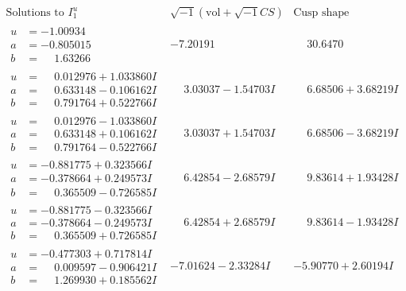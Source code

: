 \documentclass[1p]{elsarticle_modified}
\theoremstyle{definition}
\newcommand{\I}{\sqrt{-1}}
\begin{document}
$$\begin{array}{c|c|c}  
\text{Solutions to }I^u_{1}& \I (\text{vol} + \sqrt{-1}CS) & \text{Cusp shape}\\
 \hline 
\begin{aligned}
u &= -1.00934\phantom{ +0.000000I} \\
a &= -0.805015\phantom{ +0.000000I} \\
b &= \phantom{-}1.63266\phantom{ +0.000000I}\end{aligned}
 & -7.20191\phantom{ +0.000000I} & \phantom{-}30.6470\phantom{ +0.000000I} \\ \hline\begin{aligned}
u &= \phantom{-}0.012976 + 1.033860 I \\
a &= \phantom{-}0.633148 - 0.106162 I \\
b &= \phantom{-}0.791764 + 0.522766 I\end{aligned}
 & \phantom{-}3.03037 - 1.54703 I & \phantom{-}6.68506 + 3.68219 I \\ \hline\begin{aligned}
u &= \phantom{-}0.012976 - 1.033860 I \\
a &= \phantom{-}0.633148 + 0.106162 I \\
b &= \phantom{-}0.791764 - 0.522766 I\end{aligned}
 & \phantom{-}3.03037 + 1.54703 I & \phantom{-}6.68506 - 3.68219 I \\ \hline\begin{aligned}
u &= -0.881775 + 0.323566 I \\
a &= -0.378664 + 0.249573 I \\
b &= \phantom{-}0.365509 - 0.726585 I\end{aligned}
 & \phantom{-}6.42854 - 2.68579 I & \phantom{-}9.83614 + 1.93428 I \\ \hline\begin{aligned}
u &= -0.881775 - 0.323566 I \\
a &= -0.378664 - 0.249573 I \\
b &= \phantom{-}0.365509 + 0.726585 I\end{aligned}
 & \phantom{-}6.42854 + 2.68579 I & \phantom{-}9.83614 - 1.93428 I \\ \hline\begin{aligned}
u &= -0.477303 + 0.717814 I \\
a &= \phantom{-}0.009597 - 0.906421 I \\
b &= \phantom{-}1.269930 + 0.185562 I\end{aligned}
 & -7.01624 - 2.33284 I & -5.90770 + 2.60194 I \\ \hline\begin{aligned}

\end{aligned}
\end{array}$$
\end{document}
